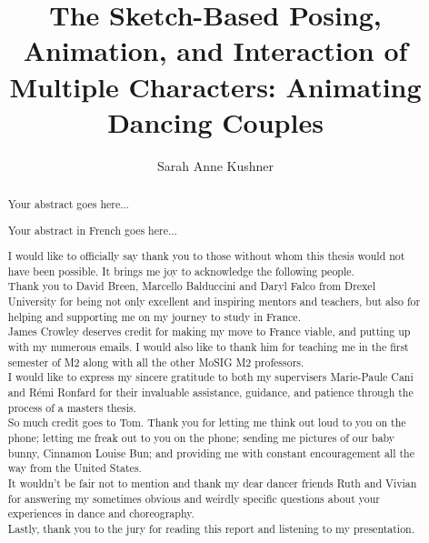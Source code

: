 \documentclass[12pt, a4paper]{memoir} %
\title{The Sketch-Based Posing, Animation, and Interaction of Multiple Characters: Animating Dancing Couples} %
\author{Sarah Anne Kushner}
\date{\mydate} %
\begin{document}
\frontmatter
\begin{titlingpage}
\maketitle
\end{titlingpage}

\setlength{\parskip}{-1pt plus 1pt}

\renewcommand{\abstracttextfont}{\normalfont}
\abstractintoc
\begin{abstract} 
Your abstract goes here... 
\end{abstract}
\abstractintoc

\renewcommand\abstractname{R\'esum\'e}
\begin{abstract} 
Your abstract in French goes here... 
\end{abstract}

\newpage

\renewcommand\abstractname{Acknowledgement}
\begin{abstract}
\newcommand{\ignore}[1]{}

I would like to officially say thank you to those without whom this thesis would not have been possible. It brings me joy to acknowledge the following people. \\

Thank you to\ignore{Associate Professor} David Breen,\ignore{Assistant Research Professor} Marcello Balduccini and\ignore{Associate Teaching Professor} Daryl Falco from Drexel University for being not only excellent and inspiring mentors and teachers, but also for helping and supporting me on my journey to study in France. \\

James Crowley deserves credit for making my move to France viable, and putting up with my numerous emails. I would also like to thank him for teaching me in the first semester of M2 along with all the other MoSIG M2 professors.\\

I would like to express my sincere gratitude to both my supervisers Marie-Paule Cani and R\'emi Ronfard for their invaluable assistance, guidance, and patience through the process of a masters thesis.\\

So much credit goes to Tom. Thank you for letting me think out loud to you on the phone; letting me freak out to you on the phone; sending me pictures of our baby bunny, Cinnamon Louise Bun; and providing me with constant encouragement all the way from the United States. \\

It wouldn't be fair not to mention and thank my dear dancer friends Ruth and Vivian for answering my sometimes obvious and weirdly specific questions about your experiences in dance and choreography.\\

Lastly, thank you to the jury for reading this report and listening to my presentation.

\end{abstract}
\end{document}
